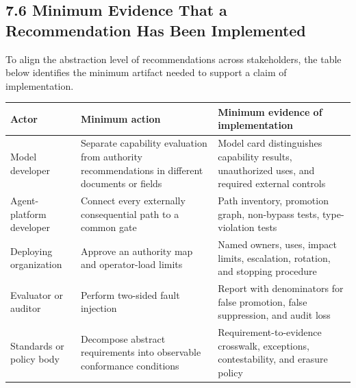 \subsection{7.6 Minimum Evidence That a Recommendation Has Been Implemented}\label{minimum-evidence-that-a-recommendation-has-been-implemented}

To align the abstraction level of recommendations across stakeholders, the table below identifies the minimum artifact needed to support a claim of implementation.

{\def\LTcaptype{none} %
\begin{longtable}[]{@{}
  >{\raggedright\arraybackslash}p{}
  >{\raggedright\arraybackslash}p{}
  >{\raggedright\arraybackslash}p{}@{}}
\toprule\noalign{}
\begin{minipage}[b]{\linewidth}\raggedright
Actor
\end{minipage} & \begin{minipage}[b]{\linewidth}\raggedright
Minimum action
\end{minipage} & \begin{minipage}[b]{\linewidth}\raggedright
Minimum evidence of implementation
\end{minipage} \\
\midrule\noalign{}
\endhead
\bottomrule\noalign{}
\endlastfoot
Model developer & Separate capability evaluation from authority recommendations in different documents or fields & Model card distinguishes capability results, unauthorized uses, and required external controls \\
Agent-platform developer & Connect every externally consequential path to a common gate & Path inventory, promotion graph, non-bypass tests, type-violation tests \\
Deploying organization & Approve an authority map and operator-load limits & Named owners, uses, impact limits, escalation, rotation, and stopping procedure \\
Evaluator or auditor & Perform two-sided fault injection & Report with denominators for false promotion, false suppression, and audit loss \\
Standards or policy body & Decompose abstract requirements into observable conformance conditions & Requirement-to-evidence crosswalk, exceptions, contestability, and erasure policy \\
\end{longtable}
}

